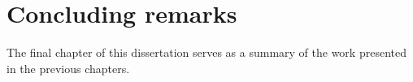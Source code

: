 \chapter{Concluding remarks}\label{Chap:conclusion}
\indent\indent The final chapter of this dissertation serves as a summary of the work presented in the previous chapters.

% 
%
